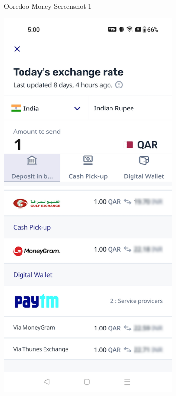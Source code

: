 \begin{figure}[!htb]
\begin{subfigure}[b]{0.32\textwidth}
        \caption{Ooredoo Money Screenshot 1}
        \label{fig:ooredoo_1}
    \end{subfigure}
    \hfill
    \begin{subfigure}[b]{0.32\textwidth}
        \centering
        \includegraphics[width=\textwidth]{images/ooredoo_money_screenshot_2.png}

\end{subfigure}
\end{figure}
